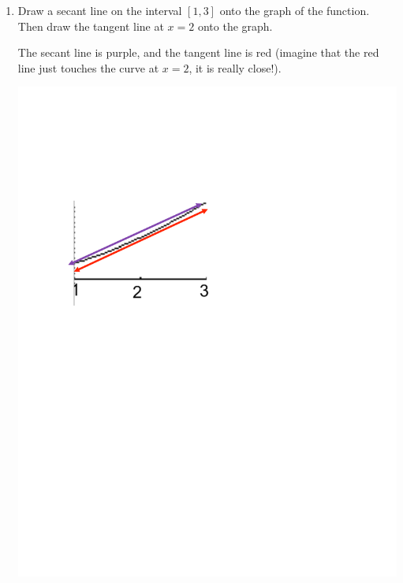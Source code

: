 \documentclass[nooutcomes]{ximera}
\begin{document}
\begin{problem}
\begin{enumerate}
		\item  Draw a secant line on the interval $[1,3]$ onto the graph of the function.  Then draw the tangent line at $x=2$ onto the graph. 
		\begin{freeResponse}		 
		The secant line is purple, and the tangent line is red (imagine that the red line just touches the curve at $x=2$, it is really close!).
			\begin{image}
			\includegraphics[trim= 80 500 300 160]{Figure6.pdf}
			\end{image}
		\end{freeResponse}
				
		\end{enumerate}
			
			
			

	
\end{problem}










								
				
\end{document}
